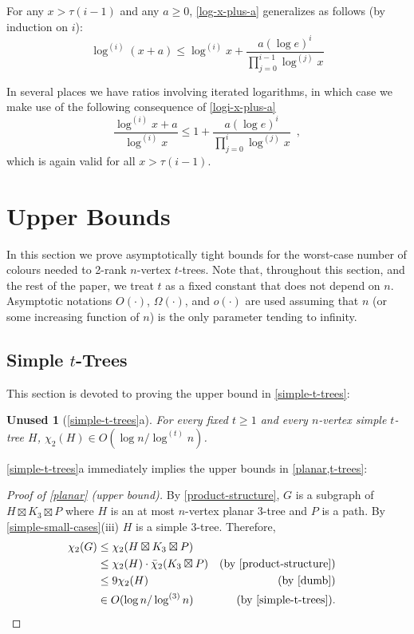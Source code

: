 \documentclass[kpfonts]{patmorin}
\newcommand{\trn}{\chi_2}
\newcommand{\dtcn}{\bar{\chi}_2}
\theoremstyle{named}
\newtheorem*{namedtheorem}{Unused}
\newcommand{\weirdref}[2]{\cref{#1}#2}
\newcommand{\weirdlabel}[2]{\label{#1-#1}}
\begin{document}
For any $x > \tau(i-1)$ and any $a\ge 0$, \cref{log-x-plus-a} generalizes as follows (by induction on $i$):
\begin{equation}
    \log^{(i)}(x+a) \le \log^{(i)} x + \frac{a(\log e)^i}{\prod_{j=0}^{i-1}\log^{(j)} x} \label{logi-x-plus-a}
\end{equation}

In several places we have ratios involving iterated logarithms, in which case we make use of the following consequence of \cref{logi-x-plus-a}
\begin{equation}
    \frac{\log^{(i)} x+a}{\log^{(i)} x} \le 1 + \frac{a(\log e)^i}{\prod_{j=0}^{i}\log^{(j)} x} \enspace, \label{logi-ratio}
\end{equation}
which is again valid for all $x> \tau(i-1)$.

\section{Upper Bounds}
\label{upper-bounds}

In this section we prove asymptotically tight bounds for the worst-case number of colours needed to 2-rank $n$-vertex $t$-trees.  Note that, throughout this section, and the rest of the paper, we treat $t$ as a fixed constant that does not depend on $n$.  Asymptotic notations $O(\cdot)$, $\Omega(\cdot)$, and $o(\cdot)$ are used assuming that $n$ (or some increasing function of $n$) is the only parameter tending to infinity.

\subsection{Simple $t$-Trees}

This section is devoted to proving the upper bound in \cref{simple-t-trees}:

\begin{namedtheorem}[\weirdref{simple-t-trees}{a}]\weirdlabel{simple-t-trees}{a}
    For every fixed $t\ge 1$ and every $n$-vertex simple $t$-tree $H$, $\trn(H)\in O(\log n/\log^{(t)} n)$.
\end{namedtheorem}

\weirdref{simple-t-trees}{a} immediately implies the upper bounds in \cref{planar,t-trees}:

\begin{proof}[Proof of \cref{planar} (upper bound)]
    By \cref{product-structure}, $G$ is a subgraph of $H\boxtimes K_3\boxtimes P$ where $H$ is an at most $n$-vertex planar 3-tree and $P$ is a path. By \cref{simple-small-cases}(iii) $H$ is a simple 3-tree. Therefore,
    \begin{align*}
        \trn(G) & \le \trn(H\boxtimes K_3\boxtimes P) \\
                & \le \trn(H)\cdot \dtcn(K_3\boxtimes P)
                    & \text{(by \cref{product-structure})}\\
                & \le 9\trn(H) & \text{(by \cref{dumb})} \\
                & \in O(\log n/\log^{(3)} n) & \text{(by \cref{simple-t-trees}).} & \qedhere
    \end{align*}
\end{proof}
\end{document}
